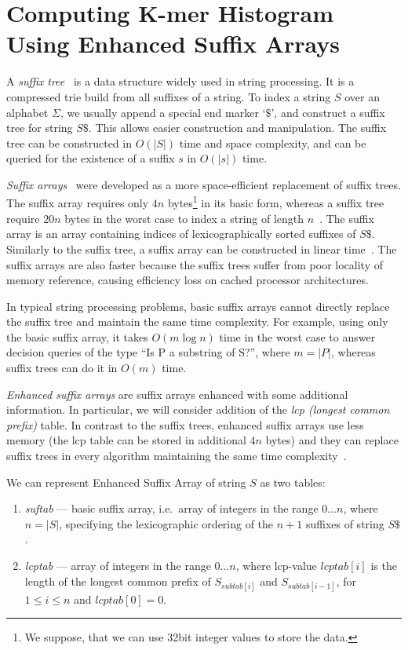 \section[Enhanced Suffix Arrays]{Computing K-mer Histogram Using Enhanced Suffix Arrays}

A \emph{suffix tree}~\cite{suffixtree} is a data structure widely used in string processing. It is a compressed trie build from all suffixes of a string. To index a string $S$ over an alphabet $\Sigma$, we usually append a special end marker `$\$ $', and construct a suffix tree for string $S\$ $.
This allows easier construction and manipulation.
The suffix tree can be constructed in $O(|S|)$ time and space complexity, and can be queried for the existence of a suffix $s$ in $O(|s|)$ time.

\emph{Suffix arrays}~\cite{suffixarray} were developed as a more space-efficient replacement of suffix trees. The suffix array requires only $4n$ bytes\footnote{We suppose, that we can use 32bit integer values to store the data.} in its basic form, whereas a suffix tree require $20n$ bytes in the worst case to index a string of length $n$~\cite{kurtz1999reducing}. The suffix array is an array containing indices of lexicographically sorted suffixes of $S\$ $. Similarly to the suffix tree, a suffix array can be constructed in linear time~\cite{karkkainen2003simple, kim2003linear, ko2003space}. The suffix arrays are also faster because the suffix trees suffer from poor locality of memory reference, causing efficiency loss on cached processor architectures.

In typical string processing problems, basic suffix arrays cannot directly replace the suffix tree and maintain the same time complexity. For example, using only the basic suffix array, it takes $O(m \log n)$ time in the worst case to answer decision queries of the type ``Is P a substring of S?'', where $m = |P|$, whereas suffix trees can do it in $O(m)$ time.

\emph{Enhanced suffix arrays} are suffix arrays enhanced with some additional information.
In particular, we will consider addition of the \emph{lcp (longest common prefix)} table.
In contrast to the suffix trees, enhanced suffix arrays use less memory (the lcp table can be stored in additional $4n$ bytes) and they can replace suffix trees in every algorithm maintaining the same time complexity~\cite{enhancedsuffixarrays}.

We can represent Enhanced Suffix Array of string $S$ as two tables:
\begin{enumerate}
  \item \emph{suftab} --- basic suffix array, i.e.\ array of integers in the range $0\dots n$, where $n = |S|$, specifying the lexicographic ordering of the $n + 1$ suffixes of string $S\$ $.
  \item \emph{lcptab} --- array of integers in the range $0\dots n$, where lcp-value $lcptab[i]$ is the length of the longest common prefix of $S_{subtab[i]}$ and $S_{subtab[i-1]}$, for $1 \leq i \leq n$ and $lcptab[0] = 0$.
\end{enumerate}

